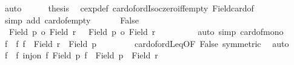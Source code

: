 \begin{isabellebody}
\ auto\isanewline
\ \ \ \ \isamarkupfalse%
\ {\isacharquery}{\kern0pt}thesis\ \isamarkupfalse%
\ cexp{\isacharunderscore}{\kern0pt}def\ card{\isacharunderscore}{\kern0pt}of{\isacharunderscore}{\kern0pt}ordIso{\isacharunderscore}{\kern0pt}czero{\isacharunderscore}{\kern0pt}iff{\isacharunderscore}{\kern0pt}empty\ Field{\isacharunderscore}{\kern0pt}card{\isacharunderscore}{\kern0pt}of\isanewline
\ \ \ \ \ \ \isamarkupfalse%
\ {\isacharparenleft}{\kern0pt}simp\ add{\isacharcolon}{\kern0pt}\ card{\isacharunderscore}{\kern0pt}of{\isacharunderscore}{\kern0pt}empty{\isacharparenright}{\kern0pt}\isanewline
\ \ \isamarkupfalse%
\isanewline
{}\isamarkupfalse%
\isanewline
\ \ \isamarkupfalse%
\ False\isanewline
\ \ \isamarkupfalse%
\ {}{\isacharcolon}{\kern0pt}\ {\isachardoublequoteopen}{\isacharbar}{\kern0pt}Field\ p{}{\isacharbar}{\kern0pt}\ {\isasymle}o\ {\isacharbar}{\kern0pt}Field\ r{}{\isacharbar}{\kern0pt}{\isachardoublequoteclose}\ \ {}{\isacharcolon}{\kern0pt}\ {\isachardoublequoteopen}{\isacharbar}{\kern0pt}Field\ p{}{\isacharbar}{\kern0pt}\ {\isasymle}o\ {\isacharbar}{\kern0pt}Field\ r{}{\isacharbar}{\kern0pt}{\isachardoublequoteclose}\isanewline
\ \ \ \ \isamarkupfalse%
\ {}\ {}\ \isamarkupfalse%
\ {\isacharparenleft}{\kern0pt}auto\ simp{\isacharcolon}{\kern0pt}\ card{\isacharunderscore}{\kern0pt}of{\isacharunderscore}{\kern0pt}mono{}{\isacharparenright}{\kern0pt}\isanewline
\ \ \isamarkupfalse%
\ f{}\ \ f{}{\isacharcolon}{\kern0pt}\ {\isachardoublequoteopen}f{}\ {\isacharbackquote}{\kern0pt}\ Field\ r{}\ {\isacharequal}{\kern0pt}\ Field\ p{}{\isachardoublequoteclose}\isanewline
\ \ \ \ \isamarkupfalse%
\ {}\ \isamarkupfalse%
\ card{\isacharunderscore}{\kern0pt}of{\isacharunderscore}{\kern0pt}ordLeq{}{\isacharbrackleft}{\kern0pt}OF\ False{\isacharcomma}{\kern0pt}\ symmetric{\isacharbrackright}{\kern0pt}\ \isamarkupfalse%
\ auto\isanewline
\ \ \isamarkupfalse%
\ f{}\ \ f{}{\isacharcolon}{\kern0pt}\ {\isachardoublequoteopen}inj{\isacharunderscore}{\kern0pt}on\ f{}\ {\isacharparenleft}{\kern0pt}Field\ p{}{\isacharparenright}{\kern0pt}{\isachardoublequoteclose}\ {\isachardoublequoteopen}f{}\ {\isacharbackquote}{\kern0pt}\ Field\ p{}\ {\isasymsubseteq}\ Field\ r{}{\isachardoublequoteclose}\isanewline

\end{isabellebody}
